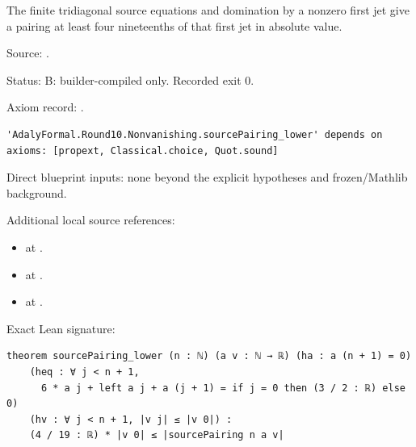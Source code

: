 \begin{theorem}[bp-185]
\label{bp-185}
\uses{}
\leanok
The finite tridiagonal source equations and domination by a nonzero first jet give a pairing at least four nineteenths of that first jet in absolute value.

\par Source: \texttt{}.
\par Status: B: builder-compiled only. Recorded exit 0.
\par Axiom record: \texttt{}.
\begin{verbatim}
'AdalyFormal.Round10.Nonvanishing.sourcePairing_lower' depends on axioms: [propext, Classical.choice, Quot.sound]
\end{verbatim}
\par Direct blueprint inputs: none beyond the explicit hypotheses and frozen/Mathlib background.
\par Additional local source references:
\begin{itemize}
\item \texttt{} at \texttt{}.
\item \texttt{} at \texttt{}.
\item \texttt{} at \texttt{}.
\end{itemize}
\par Exact Lean signature:
\begin{verbatim}
theorem sourcePairing_lower (n : ℕ) (a v : ℕ → ℝ) (ha : a (n + 1) = 0)
    (heq : ∀ j < n + 1,
      6 * a j + left a j + a (j + 1) = if j = 0 then (3 / 2 : ℝ) else 0)
    (hv : ∀ j < n + 1, |v j| ≤ |v 0|) :
    (4 / 19 : ℝ) * |v 0| ≤ |sourcePairing n a v|
\end{verbatim}
\end{theorem}

